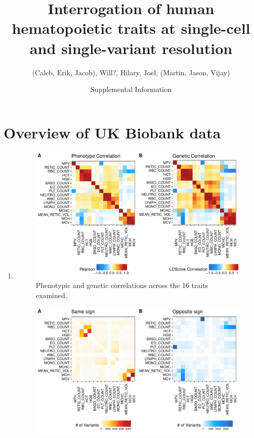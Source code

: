 \documentclass{article}\usepackage[]{graphicx}\usepackage[]{color}
\title{Interrogation of human hematopoietic traits at single-cell and single-variant resolution}
\date{Supplemental Information}
\author{(Caleb, Erik, Jacob), Will?, Hilary, Joel, (Martin, Jason, Vijay)}
\makeatletter
\def\maxwidth{ %
  \ifdim\Gin@nat@width>\linewidth
    \linewidth
  \else
    \Gin@nat@width
  \fi
}
\newenvironment{knitrout}{}{} %
\makeatother
\begin{document}
\maketitle
\section*{Overview of UK Biobank data}
\begin{enumerate}[label=(\Alph*)]
\item 



\begin{knitrout}
\color{fgcolor}\begin{figure}[H]

{\centering \includegraphics[width=\maxwidth]{figure/correlationPlots-1} 

}

\caption[Phenotypic and genetic correlations across the 16 traits examined]{Phenotypic and genetic correlations across the 16 traits examined. }\label{fig:correlationPlots}
\end{figure}


\end{knitrout}




\begin{knitrout}
\color{fgcolor}\begin{figure}[H]

{\centering \includegraphics[width=\maxwidth]{figure/pleiotropyPlots-1} 

}
\end{figure}
\end{knitrout}
\end{enumerate}
\end{document}
